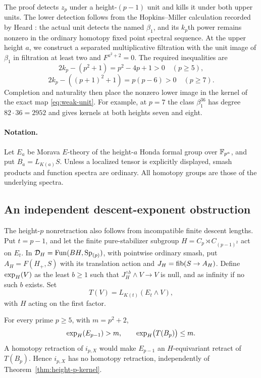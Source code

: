 The proof detects $z_p$ under a height-$(p-1)$ unit and kills it under
both upper units. The lower detection follows from the Hopkins--Miller
calculation recorded by Heard
\cite[proof of Theorem~5.6 and Lemma~5.8]{heard2015}: the actual unit
detects the named $\beta_1$, and its $k_p$th power remains nonzero in
the ordinary homotopy fixed point spectral sequence. At the upper
height $a$, we construct a separated multiplicative filtration with
the unit image of $\beta_1$ in filtration at least two and
$F^{a^2+2}=0$. The required
inequalities are
\[
 2k_p-(p^2+1)=p^2-4p+1>0\quad(p\geq5),
\]
\[
 2k_p-((p+1)^2+1)=p(p-6)>0\quad(p\geq7).
\]
Completion and naturality then place the nonzero lower image in the
kernel of the exact map \eqref{eq:weak-unit}. For example, at $p=7$
the class $\beta_1^{36}$ has degree $82\cdot36=2952$ and gives
kernels at both heights seven and eight.

\paragraph{Notation.}\label{par:common-notation}
Let $E_a$ be Morava $E$-theory of the height-$a$ Honda formal group
over $\mathbb F_{p^a}$, and put $B_a=L_{K(a)}S$. Unless a localized tensor
is explicitly displayed, smash products and function spectra are
ordinary. All homotopy groups are those of the underlying spectra.

\subsection{An independent descent-exponent obstruction}

The height-$p$ nonretraction also follows from incompatible finite
descent lengths. Put $t=p-1$, and let the finite pure-stabilizer subgroup
$H=C_p\rtimes C_{(p-1)^2}$ act on $E_t$. In
$\mathcal D_H=\operatorname{Fun}(BH,\mathrm{Sp}_{(p)})$, with pointwise ordinary smash, put
$A_H=F(H_+,S)$ with its translation action and
$J_H=\operatorname{fib}(S\to A_H)$. Define $\operatorname{exp}_H(V)$ as the least $b\geq1$
such that $J_H^{\wedge b}\wedge V\to V$ is null, and as infinity
if no such $b$ exists. Set
\[
 T(V)=L_{K(t)}(E_t\wedge V),
\]
with $H$ acting on the first factor.

\begin{theorem}\label{thm:exponents}
For every prime $p\geq5$, with $m=p^2+2$,
\[
 \operatorname{exp}_H(E_{p-1})>m,
 \qquad \operatorname{exp}_H\bigl(T(B_p)\bigr)\leq m.
\]
A homotopy retraction of $i_{p,X}$ would make $E_{p-1}$ an
$H$-equivariant retract of $T(B_p)$. Hence $i_{p,X}$ has no homotopy
retraction, independently of Theorem~\ref{thm:height-p-kernel}.
\end{theorem}

